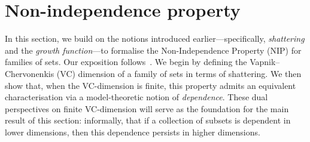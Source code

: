 \section{Non-independence property}\label{sec:nip-property}

In this section, we build on the notions introduced earlier—specifically, \textit{shattering} and the \textit{growth function}—to formalise the Non-Independence Property (NIP) for families of sets. Our exposition follows~\cite[Chap.~5]{vandenDries1998}. We begin by defining the Vapnik–Chervonenkis (VC) dimension of a family of sets in terms of shattering. We then show that, when the VC-dimension is finite, this property admits an equivalent characterisation via a model-theoretic notion of \textit{dependence}. These dual perspectives on finite VC-dimension will serve as the foundation for the main result of this section: informally, that if a collection of subsets is dependent in lower dimensions, then this dependence persists in higher dimensions.





